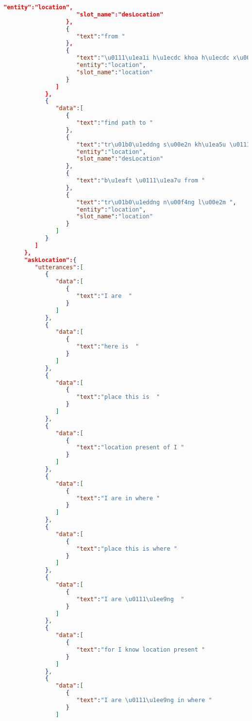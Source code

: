 \begin{lstlisting}[language=json,firstnumber=1]
                     "entity":"location",
                     "slot_name":"desLocation"
                  },
                  {
                     "text":"from "
                  },
                  {
                     "text":"\u0111\u1ea1i h\u1ecdc khoa h\u1ecdc x\u00e3 h\u1ed9i v\u00e0 nh\u00e2n v\u0103n ",
                     "entity":"location",
                     "slot_name":"location"
                  }
               ]
            },
            {
               "data":[
                  {
                     "text":"find path to "
                  },
                  {
                     "text":"tr\u01b0\u1eddng s\u00e2n kh\u1ea5u \u0111i\u1ec7n \u1ea3nh ",
                     "entity":"location",
                     "slot_name":"desLocation"
                  },
                  {
                     "text":"b\u1eaft \u0111\u1ea7u from "
                  },
                  {
                     "text":"tr\u01b0\u1eddng n\u00f4ng l\u00e2m ",
                     "entity":"location",
                     "slot_name":"location"
                  }
               ]
            }
         ]
      },
      "askLocation":{
         "utterances":[
            {
               "data":[
                  {
                     "text":"I are  "
                  }
               ]
            },
            {
               "data":[
                  {
                     "text":"here is  "
                  }
               ]
            },
            {
               "data":[
                  {
                     "text":"place this is  "
                  }
               ]
            },
            {
               "data":[
                  {
                     "text":"location present of I "
                  }
               ]
            },
            {
               "data":[
                  {
                     "text":"I are in where "
                  }
               ]
            },
            {
               "data":[
                  {
                     "text":"place this is where "
                  }
               ]
            },
            {
               "data":[
                  {
                     "text":"I are \u0111\u1ee9ng  "
                  }
               ]
            },
            {
               "data":[
                  {
                     "text":"for I know location present "
                  }
               ]
            },
            {
               "data":[
                  {
                     "text":"I are \u0111\u1ee9ng in where "
                  }
               ]

\end{lstlisting}
